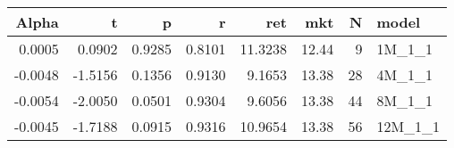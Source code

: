 \begin{table}[ht]
\centering
\begin{tabular}{rrrrrrrl}
  \hline
Alpha & t & p & r & ret & mkt & N & model \\ 
  \hline
0.0005 & 0.0902 & 0.9285 & 0.8101 & 11.3238 & 12.44 & 9 & 1M\_1\_1 \\ 
  -0.0048 & -1.5156 & 0.1356 & 0.9130 & 9.1653 & 13.38 & 28 & 4M\_1\_1 \\ 
  -0.0054 & -2.0050 & 0.0501 & 0.9304 & 9.6056 & 13.38 & 44 & 8M\_1\_1 \\ 
  -0.0045 & -1.7188 & 0.0915 & 0.9316 & 10.9654 & 13.38 & 56 & 12M\_1\_1 \\ 
   \hline
\end{tabular}
\end{table}

